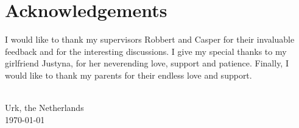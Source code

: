 
\chapter{\label{chap:Preface}Acknowledgements}
I would like to thank my supervisors Robbert and Casper for their invaluable feedback and for the interesting discussions.
I give my special thanks to my girlfriend Justyna, for her neverending love, support and patience.
Finally, I would like to thank my parents for their endless love and support.

\vspace{1cm}
\begin{flushright}
\theauthor{}\\
Urk, the Netherlands\\
\today{}\\
\end{flushright}
